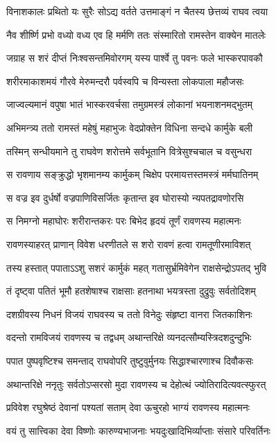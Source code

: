 \twolineshloka
{विनाशकालः प्रथितो यः सुरैः सोऽद्य वर्तते}
{उत्तमाङ्गं न चैतस्य छेत्तव्यं राघव त्वया} %

\twolineshloka
{नैव शीर्ष्णि प्रभो वध्यो वध्य एव हि मर्मणि}
{ततः संस्मारितो रामस्तेन वाक्येन मातलेः} %

\twolineshloka
{जग्राह स शरं दीप्तं निःश्वसन्तमिवोरगम्}
{यस्य पार्श्वे तु पवनः फले भास्करपावकौ} %

\twolineshloka
{शरीरमाकाशमयं गौरवे मेरुमन्दरौ}
{पर्वस्वपि च विन्यस्ता लोकपाला महौजसः} %

\twolineshloka
{जाज्वल्यमानं वपुषा भातं भास्करवर्चसा}
{तमुग्रमस्त्रं लोकानां भयनाशनमद्भुतम्} %

\twolineshloka
{अभिमन्त्र्य ततो रामस्तं महेषुं महाभुजः}
{वेदप्रोक्तेन विधिना सन्दधे कार्मुके बली} %

\twolineshloka
{तस्मिन् सन्धीयमाने तु राघवेण शरोत्तमे}
{सर्वभूतानि वित्रेसुश्चचाल च वसुन्धरा} %

\twolineshloka
{स रावणाय सङ्क्रुद्धो भृशमानम्य कार्मुकम्}
{चिक्षेप परमायत्तस्तमस्त्रं मर्मघातिनम्} %

\twolineshloka
{स वज्र इव दुर्धर्षो वज्रपाणिविसर्जितः}
{कृतान्त इव घोरास्यो न्यपतद्रावणोरसि} %

\twolineshloka
{स निमग्नो महाघोरः शरीरान्तकरः परः}
{बिभेद हृदयं तूर्णं रावणस्य महात्मनः} %

\twolineshloka
{रावणस्याहरत् प्राणान् विवेश धरणीतले}
{स शरो रावणं हत्वा रामतूणीरमाविशत्} %

\twolineshloka
{तस्य हस्तात् पपाताऽऽशु सशरं कार्मुकं महत्}
{गतासुर्भ्रमिवेगेन राक्षसेन्द्रोऽपतद् भुवि} %

\twolineshloka
{तं दृष्ट्वा पतितं भूमौ हतशेषाश्च राक्षसाः}
{हतनाथा भयत्रस्ता दुद्रुवुः सर्वतोदिशम्} %

\twolineshloka
{दशग्रीवस्य निधनं विजयं राघवस्य च}
{ततो विनेदुः संहृष्टा वानरा जितकाशिनः} %

\twolineshloka
{वदन्तो रामविजयं रावणस्य च तद्वधम्}
{अथान्तरिक्षे व्यनदत्सौम्यस्त्रिदशदुन्दुभिः} %

\twolineshloka
{पपात पुष्पवृष्टिश्च समन्ताद् राघवोपरि}
{तुष्टुवुर्मुनयः सिद्धाश्चारणाश्च दिवौकसः} %

\twolineshloka
{अथान्तरिक्षे ननृतुः सर्वतोऽप्सरसो मुदा}
{रावणस्य च देहोत्थं ज्योतिरादित्यवत्स्फुरत्} %

\twolineshloka
{प्रविवेश रघुश्रेष्ठं देवानां पश्यतां सताम्}
{देवा ऊचुरहो भाग्यं रावणस्य महात्मनः} %

\twolineshloka
{वयं तु सात्त्विका देवा विष्णोः कारुण्यभाजनाः}
{भयदुःखादिभिर्व्याप्ताः संसारे परिवर्तिनः} %

